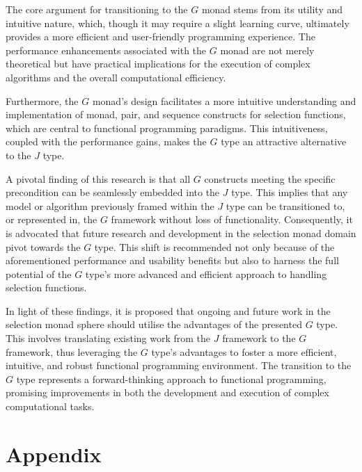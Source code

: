 \documentclass[runningheads]{llncs}
\begin{document}
\qquad The core argument for transitioning to the \(G\) monad stems from
its utility and intuitive nature, which, though it may require a slight
learning curve, ultimately provides a more efficient and user-friendly
programming experience. The performance enhancements associated with the
\(G\) monad are not merely theoretical but have practical implications
for the execution of complex algorithms and the overall computational
efficiency.

\qquad Furthermore, the \(G\) monad's design facilitates a more
intuitive understanding and implementation of monad, pair, and sequence
constructs for selection functions, which are central to functional
programming paradigms. This intuitiveness, coupled with the performance
gains, makes the \(G\) type an attractive alternative to the \(J\) type.

\qquad A pivotal finding of this research is that all \(G\) constructs
meeting the specific precondition can be seamlessly embedded into the
\(J\) type. This implies that any model or algorithm previously framed
within the \(J\) type can be transitioned to, or represented in, the
\(G\) framework without loss of functionality. Consequently, it is
advocated that future research and development in the selection monad
domain pivot towards the \(G\) type. This shift is recommended not only
because of the aforementioned performance and usability benefits but
also to harness the full potential of the \(G\) type's more advanced and
efficient approach to handling selection functions.

\qquad In light of these findings, it is proposed that ongoing and
future work in the selection monad sphere should utilise the advantages
of the presented \(G\) type. This involves translating existing work
from the \(J\) framework to the \(G\) framework, thus leveraging the
\(G\) type's advantages to foster a more efficient, intuitive, and
robust functional programming environment. The transition to the \(G\)
type represents a forward-thinking approach to functional programming,
promising improvements in both the development and execution of complex
computational tasks.

%
%
%
% 
% 
%



\newpage
\section*{Appendix}
\appendix
\end{document}
